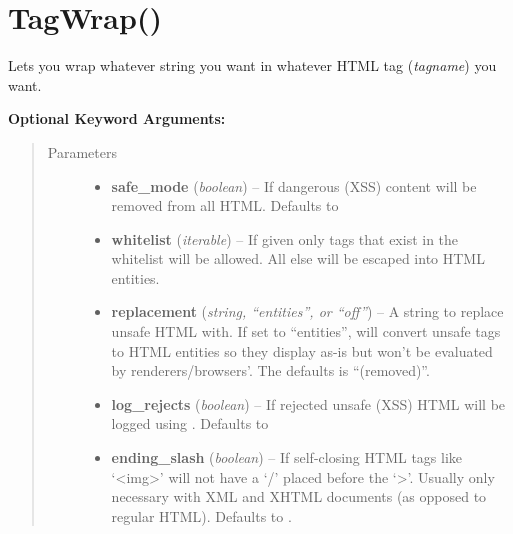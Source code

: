 \documentclass[letterpaper,10pt,english]{sphinxmanual}
\begin{document}
\chapter{TagWrap()}
\label{index:tagwrap}

\begin{fulllineitems}
Lets you wrap whatever string you want in whatever HTML tag (\emph{tagname}) you
want.

\textbf{Optional Keyword Arguments:}
\begin{quote}\begin{description}
\item[{Parameters}] \leavevmode\begin{itemize}
\item {} 
\textbf{safe\_mode} (\emph{boolean}) -- If \href{http://docs.python.org/library/constants.html\#True}{} dangerous (XSS) content will be removed
from all HTML.  Defaults to \href{http://docs.python.org/library/constants.html\#True}{}

\item {} 
\textbf{whitelist} (\emph{iterable}) -- If given only tags that exist in the whitelist will be
allowed.  All else will be escaped into HTML entities.

\item {} 
\textbf{replacement} (\emph{string, ``entities'', or ``off''}) -- A string to replace unsafe HTML with.  If set to
``entities'', will convert unsafe tags to HTML entities so they
display as-is but won't be evaluated by renderers/browsers'.  The
defaults is ``(removed)''.

\item {} 
\textbf{log\_rejects} (\emph{boolean}) -- If \href{http://docs.python.org/library/constants.html\#True}{} rejected unsafe (XSS) HTML will be
logged using .  Defaults to \href{http://docs.python.org/library/constants.html\#False}{}

\item {} 
\textbf{ending\_slash} (\emph{boolean}) -- If \href{http://docs.python.org/library/constants.html\#True}{} self-closing HTML tags like `\textless{}img\textgreater{}'
will not have a `/' placed before the `\textgreater{}'.  Usually only necessary
with XML and XHTML documents (as opposed to regular HTML).  Defaults
to \href{http://docs.python.org/library/constants.html\#False}{}.


\end{itemize}
\end{description}
\end{quote}
\end{fulllineitems}
\end{document}
